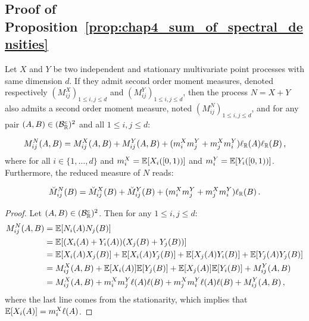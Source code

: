 \begin{subappendices}

    \section{Proof of Proposition~\ref{prop:chap4_sum_of_spectral_densities}}\label{appendix:chap4_proof_sum_spectra}
          
    \begin{lemma}\label{lemma:sum_second_order_moment}
      Let $X$ and $Y$ be two independent and stationary multivariate point processes with same dimension $d$.
      If they admit second order moment measures, denoted respectively $(M_{ij}^{X})_{1 \le i, j \le d}$ and $(M_{ij}^{Y})_{1 \le i, j \le d}$,
      then the process $N = X + Y$ also admits a second order moment measure,
      noted $(M_{ij}^N)_{1 \le i, j \le d}$,
      and for any pair $(A, B) \in (\mathcal{B}_{{\mathbb R}}^c)^2$ and all $1 \le i, j \le d$:
      
      \begin{equation}\label{eq:chap4_relation_second_moment}
          M_{ij}^N(A, B) = M_{ij}^{X}(A, B) + M_{ij}^{Y}(A, B) + (m_i^X m_j^Y + m_j^X m_i^Y)\ell_{\mathbb R}(A)\ell_{\mathbb R}(B)\,,
      \end{equation}
      where for all $i \in \{1, \dots, d\}$ and $m_i^X = {\mathbb E}[X_i([0, 1))]$ and $m_i^Y = {\mathbb E}[Y_i([0, 1))]$.
      Furthermore, the reduced measure of $N$ reads:

          \begin{equation}\label{eq:chap4_relation_reduced_moment}
          \breve M_{ij}^N(B) = \breve M_{ij}^X(B) + \breve M_{ij}^Y(B)+ (m_i^X m_j^Y + m_j^X m_i^Y)\ell_{{\mathbb R}}(B)\,.
      \end{equation}
     
    \end{lemma}

    \begin{proof}

    Let $(A,B)\in (\mathcal{B}_{{\mathbb R}}^c)^2$. Then for any $1 \leq i,j \leq d$:
  \begin{align*}
      M_{ij}^N(A, B) &= {\mathbb E}[N_i(A)N_j(B)] \\
      &= {\mathbb E}[(X_i(A) + Y_i(A))(X_j(B) + Y_j(B))]\\
      &= {\mathbb E}[X_i(A)X_j(B)] + {\mathbb E}[X_i(A)Y_j(B)] + {\mathbb E}[X_j(A)Y_i(B)] + {\mathbb E}[Y_j(A)Y_j(B)]\\
      &= M_{ij}^X(A,B) + {\mathbb E}[X_i(A)]{\mathbb E}[Y_j(B)] + {\mathbb E}[X_j(A)]{\mathbb E}[Y_i(B)] + M_{ij}^Y(A,B)\\
      &= M_{ij}^X(A,B) + m_i^X m_j^Y\ell(A)\ell(B) + m_j^X m_i^Y\ell(A)\ell(B) + M_{ij}^Y(A,B)\,,
  \end{align*}
  where the last line comes from the stationarity, which implies that ${\mathbb E}[X_i(A)] = m_i^X \ell(A)$.
   

\end{proof}
\end{subappendices}
